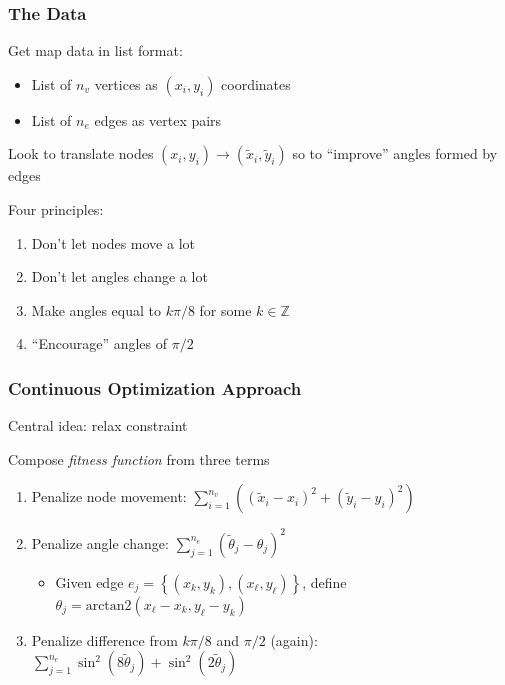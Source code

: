 \documentclass[12pt,t,xcolor=dvipsnames]{beamer}
\begin{document}
\begin{frame}
  \frametitle{The Data}

  Get map data in list format:
  \begin{itemize}
  \item List of $n_v$ vertices as $(x_i,y_i)$ coordinates
  \item List of $n_e$ edges as vertex pairs
  \end{itemize}

  \begin{center}
    Look to translate nodes $(x_i,y_i) \rightarrow (\tilde{x}_i,\tilde{y}_i)$ so
    to ``improve'' angles formed by edges
  \end{center}
\pause
  Four principles:
  \begin{enumerate}
  \item Don't let nodes move a lot
  \item Don't let angles change a lot
  \item Make angles equal to $k\pi/8$ for some $k\in\mathbb{Z}$
  \item ``Encourage'' angles of $\pi/2$
  \end{enumerate}


\end{frame}


\begin{frame}
  \frametitle{Continuous Optimization Approach}

  \begin{center}
    Central idea: relax constraint
  \end{center}

  Compose {\it fitness function} from three terms
  \begin{enumerate}
  \item Penalize node movement: $\displaystyle\sum_{i=1}^{n_v}
    \left((\tilde{x}_i-x_i)^2+(\tilde{y}_i - y_i)^2\right)$
  \item Penalize angle change: $\displaystyle\sum_{j=1}^{n_e} \left(\tilde{\theta}_j -
    \theta_j\right)^2$
    \begin{itemize}
    \item Given edge $e_j = \left\{(x_k,y_k),(x_\ell,y_\ell)\right\}$,
      define $\theta_j = \text{arctan2}(x_\ell-x_k,y_\ell-y_k)$
    \end{itemize}
    \item Penalize difference from $k\pi/8$ and $\pi/2$ (again): $\displaystyle\sum_{j=1}^{n_e}\sin^2\left(8\tilde{\theta}_j\right)+\sin^2\left(2\tilde{\theta}_j\right)$
  \end{enumerate}
  
\end{frame}
\end{document}
